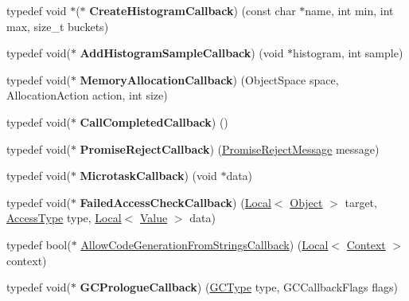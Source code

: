 \begin{DoxyCompactItemize}
\item 
\hypertarget{namespacev8_aafbf15734701792a14c02dbca7535b75}{}typedef void $\ast$($\ast$ {\bfseries Create\+Histogram\+Callback}) (const char $\ast$name, int min, int max, size\+\_\+t buckets)\label{namespacev8_aafbf15734701792a14c02dbca7535b75}

\item 
\hypertarget{namespacev8_a5a7c6bb8050ad84f0a453056ec325d1c}{}typedef void($\ast$ {\bfseries Add\+Histogram\+Sample\+Callback}) (void $\ast$histogram, int sample)\label{namespacev8_a5a7c6bb8050ad84f0a453056ec325d1c}

\item 
\hypertarget{namespacev8_a2402a6535cafc5f721192b300502fb0a}{}typedef void($\ast$ {\bfseries Memory\+Allocation\+Callback}) (Object\+Space space, Allocation\+Action action, int size)\label{namespacev8_a2402a6535cafc5f721192b300502fb0a}

\item 
\hypertarget{namespacev8_a8d88696ff21bd777d488605cb7714573}{}typedef void($\ast$ {\bfseries Call\+Completed\+Callback}) ()\label{namespacev8_a8d88696ff21bd777d488605cb7714573}

\item 
\hypertarget{namespacev8_a3367f6ae375d6d4b4b3f992953c135ba}{}typedef void($\ast$ {\bfseries Promise\+Reject\+Callback}) (\hyperlink{classv8_1_1_promise_reject_message}{Promise\+Reject\+Message} message)\label{namespacev8_a3367f6ae375d6d4b4b3f992953c135ba}

\item 
\hypertarget{namespacev8_a64445c32058729cdc44d56ff13458bed}{}typedef void($\ast$ {\bfseries Microtask\+Callback}) (void $\ast$data)\label{namespacev8_a64445c32058729cdc44d56ff13458bed}

\item 
\hypertarget{namespacev8_a1352a0d6e487b7092ea79e2d3d4ecd12}{}typedef void($\ast$ {\bfseries Failed\+Access\+Check\+Callback}) (\hyperlink{classv8_1_1_local}{Local}$<$ \hyperlink{classv8_1_1_object}{Object} $>$ target, \hyperlink{namespacev8_add8bef6469c5b94706584124e610046c}{Access\+Type} type, \hyperlink{classv8_1_1_local}{Local}$<$ \hyperlink{classv8_1_1_value}{Value} $>$ data)\label{namespacev8_a1352a0d6e487b7092ea79e2d3d4ecd12}

\item 
typedef bool($\ast$ \hyperlink{namespacev8_a521d909ec201742a1cb35d50a8e2a3c2}{Allow\+Code\+Generation\+From\+Strings\+Callback}) (\hyperlink{classv8_1_1_local}{Local}$<$ \hyperlink{classv8_1_1_context}{Context} $>$ context)
\item 
\hypertarget{namespacev8_a09e509ff7a94ad074420980c5f5762af}{}typedef void($\ast$ {\bfseries G\+C\+Prologue\+Callback}) (\hyperlink{namespacev8_ac109d6f27e0c0f9ef4e98bcf7a806cf2}{G\+C\+Type} type, G\+C\+Callback\+Flags flags)\label{namespacev8_a09e509ff7a94ad074420980c5f5762af}


\end{DoxyCompactItemize}
